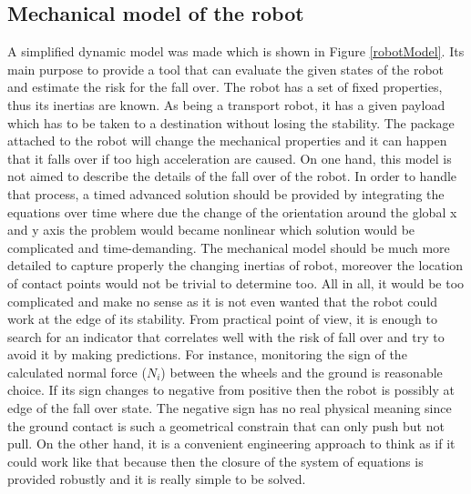 \documentclass[12pt,english]{article}
\begin{document}
\newpage
\subsection{Mechanical model of the robot}
A simplified dynamic model was made which is shown in Figure \ref{robotModel}. Its main purpose to provide a tool that can evaluate the given states of the robot and estimate the risk for the fall over. The robot has a set of fixed properties, thus its inertias are known. As being a transport robot, it has a given payload which has to be taken to a destination without losing the stability. The package attached to the robot will change the mechanical properties and it can happen that it falls over if too high acceleration are caused. On one hand, this model is not aimed to describe the details of the fall over of the robot. In order to handle that process, a timed advanced solution should be provided by integrating the equations over time where due the change of the orientation around the global x and y axis the problem would became nonlinear which solution would be complicated and time-demanding. The mechanical model should be much more detailed to capture properly the changing inertias of robot, moreover the location of contact points would not be trivial to determine too. All in all, it would be too complicated and make no sense as it is not even wanted that the robot could work at the edge of its stability. From practical point of view, it is enough to search for an indicator that correlates well with the risk of fall over and try to avoid it by making predictions. For instance, monitoring the sign of the calculated normal force ($N_i$) between the wheels and the ground is reasonable choice. If its sign changes to negative from positive then the robot is possibly at edge of the fall over state. The negative sign has no real physical meaning since the ground contact is such a geometrical constrain that can only push but not pull. On the other hand, it is a convenient engineering approach to think as if it could work like that because then the closure of the system of equations is provided robustly and it is really simple to be solved.
\end{document}
